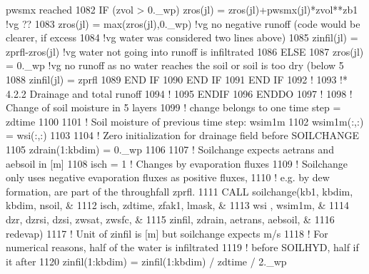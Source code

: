 \begin{DoxyCode}
{{       pwsmx reached}
1082               \textcolor{keywordflow}{IF} (zvol > 0.\_wp) zros(jl) = zros(jl)+pwsmx(jl)*zvol**zb1 \textcolor{comment}{!vg  ??}
1083               zros(jl)   = max(zros(jl),0.\_wp)                          \textcolor{comment}{!vg  no negative runoff (code would
       be clearer, if excess }
1084                                                                         \textcolor{comment}{!vg       water was considered two
       lines above)}
1085               zinfil(jl) = zprfl-zros(jl)                               \textcolor{comment}{!vg  water not going into runoff is
       infiltrated}
1086             \textcolor{keywordflow}{ELSE}
1087               zros(jl)   = 0.\_wp   \textcolor{comment}{!vg  no runoff as no water reaches the soil or soil is too dry (below
       5%
1088               zinfil(jl) = zprfl
1089 \textcolor{keywordflow}{            END IF}
1090 \textcolor{keywordflow}{          END IF}
1091 \textcolor{keywordflow}{        END IF}
1092 \textcolor{comment}{!}
1093 \textcolor{comment}{!*    4.2.2  Drainage and total runoff}
1094 \textcolor{comment}{!}
1095 \textcolor{keywordflow}{      ENDIF}
1096 \textcolor{keywordflow}{    ENDDO}
1097 \textcolor{comment}{!}
1098       \textcolor{comment}{!  Change of soil moisture in 5 layers}
1099       \textcolor{comment}{!  change belongs to one time step = zdtime}
1100 
1101       \textcolor{comment}{! Soil moisture of previous time step: wsim1m}
1102       wsim1m(:,:) = wsi(:,:)
1103 
1104       \textcolor{comment}{! Zero initialization for drainage field before SOILCHANGE}
1105       zdrain(1:kbdim) = 0.\_wp
1106 
1107       \textcolor{comment}{! Soilchange expects aetrans and aebsoil in [m]}
1108       isch = 1     \textcolor{comment}{! Changes by evaporation fluxes}
1109                    \textcolor{comment}{! Soilchange only uses negative evaporation fluxes as positive fluxes,}
1110                    \textcolor{comment}{! e.g. by dew formation, are part of the throughfall zprfl.}
1111       \textcolor{keyword}{CALL }soilchange(kb1, kbdim, kbdim, nsoil,     &
1112             isch, zdtime, zfak1, lmask,             &
1113             wsi , wsim1m,                           &
1114             dzr, dzrsi,    dzsi, zwsat, zwsfc,      &
1115             zinfil, zdrain, aetrans, aebsoil,       &
1116             redevap)
1117       \textcolor{comment}{! Unit of zinfil is [m] but soilchange expects m/s}
1118       \textcolor{comment}{! For numerical reasons, half of the water is infiltrated}
1119       \textcolor{comment}{! before SOILHYD, half if it after}
1120       zinfil(1:kbdim) = zinfil(1:kbdim) / zdtime / 2.\_wp
}}
\end{DoxyCode}

